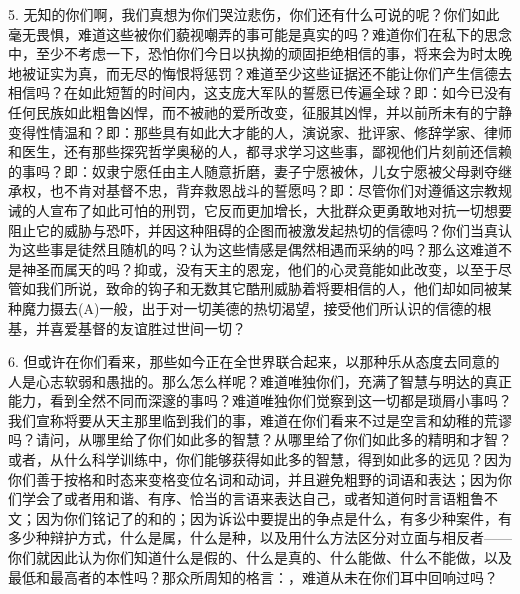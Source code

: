 5. 无知的你们啊，我们真想为你们哭泣悲伤，你们还有什么可说的呢？你们如此毫无畏惧，难道这些被你们藐视嘲弄的事可能是真实的吗？难道你们在私下的思念中，至少不考虑一下，恐怕你们今日以执拗的顽固拒绝相信的事，将来会为时太晚地被证实为真，而无尽的悔恨将惩罚？难道至少这些证据还不能让你们产生信德去相信吗？在如此短暂的时间内，这支庞大军队的誓愿已传遍全球？即：如今已没有任何民族如此粗鲁凶悍，而不被祂的爱所改变，征服其凶悍，并以前所未有的宁静变得性情温和？即：那些具有如此大才能的人，演说家、批评家、修辞学家、律师和医生，还有那些探究哲学奥秘的人，都寻求学习这些事，鄙视他们片刻前还信赖的事吗？即：奴隶宁愿任由主人随意折磨，妻子宁愿被休，儿女宁愿被父母剥夺继承权，也不肯对基督不忠，背弃救恩战斗的誓愿吗？即：尽管你们对遵循这宗教规诫的人宣布了如此可怕的刑罚，它反而更加增长，大批群众更勇敢地对抗一切想要阻止它的威胁与恐吓，并因这种阻碍的企图而被激发起热切的信德吗？你们当真认为这些事是徒然且随机的吗？认为这些情感是偶然相遇而采纳的吗？那么这难道不是神圣而属天的吗？抑或，没有天主的恩宠，他们的心灵竟能如此改变，以至于尽管如我们所说，致命的钩子和无数其它酷刑威胁着将要相信的人，他们却如同被某种魔力摄去(A)一般，出于对一切美德的热切渴望，接受他们所认识的信德的根基，并喜爱基督的友谊胜过世间一切？\par

6. 但或许在你们看来，那些如今正在全世界联合起来，以那种乐从态度去同意的人是心志软弱和愚拙的。那么怎么样呢？难道唯独你们，充满了智慧与明达的真正能力，看到全然不同而深邃的事吗？难道唯独你们觉察到这一切都是琐屑小事吗？我们宣称将要从天主那里临到我们的事，难道在你们看来不过是空言和幼稚的荒谬吗？请问，从哪里给了你们如此多的智慧？从哪里给了你们如此多的精明和才智？或者，从什么科学训练中，你们能够获得如此多的智慧，得到如此多的远见？因为你们善于按格和时态来变格变位名词和动词，并且避免粗野的词语和表达；因为你们学会了或者用和谐、有序、恰当的言语来表达自己，或者知道何时言语粗鲁不文；因为你们铭记了的和的；因为诉讼中要提出的争点是什么，有多少种案件，有多少种辩护方式，什么是属，什么是种，以及用什么方法区分对立面与相反者——你们就因此认为你们知道什么是假的、什么是真的、什么能做、什么不能做，以及最低和最高者的本性吗？那众所周知的格言：，难道从未在你们耳中回响过吗？\par

